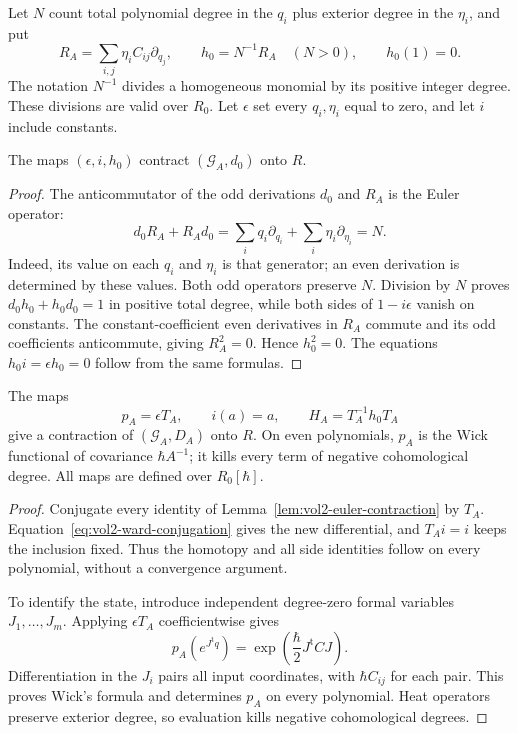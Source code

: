 Let $N$ count total polynomial degree in the $q_i$ plus exterior
degree in the $\eta_i$, and put
\[
 R_A=\sum_{i,j}\eta_iC_{ij}\partial_{q_j},\qquad
 h_0=N^{-1}R_A\quad(N>0),\qquad h_0(1)=0.
\]
The notation $N^{-1}$ divides a homogeneous monomial by its
positive integer degree. These divisions are valid over $R_0$.
Let $\epsilon$ set every $q_i,\eta_i$ equal to zero, and let
$i$ include constants.

\begin{lemma}\label{lem:vol2-euler-contraction}
The maps $(\epsilon,i,h_0)$ contract $(\mathcal G_A,d_0)$ onto $R$.
\end{lemma}
\begin{proof}
The anticommutator of the odd derivations $d_0$ and $R_A$ is the
Euler operator:
\[
 d_0R_A+R_Ad_0
   =\sum_iq_i\partial_{q_i}
      +\sum_i\eta_i\partial_{\eta_i}=N.
\]
Indeed, its value on each $q_i$ and $\eta_i$ is that generator;
an even derivation is determined by these values. Both odd
operators preserve $N$. Division by $N$ proves
$d_0h_0+h_0d_0=1$ in positive total degree, while both sides of
$1-i\epsilon$ vanish on constants. The constant-coefficient even
derivatives in $R_A$ commute and its odd coefficients
anticommute, giving $R_A^2=0$. Hence $h_0^2=0$.
The equations $h_0i=\epsilon h_0=0$ follow from the same formulas.
\end{proof}

\begin{theorem}\label{thm:vol2-gaussian-retract}
The maps
\begin{equation}\label{eq:vol2-gaussian-retract}
 p_A=\epsilon T_A,\qquad i(a)=a,\qquad
 H_A=T_A^{-1}h_0T_A
\end{equation}
give a contraction of $(\mathcal G_A,D_A)$ onto $R$.
On even polynomials, $p_A$ is the Wick functional of covariance
$\hbar A^{-1}$; it kills every term of negative cohomological degree.
All maps are defined over $R_0[\hbar]$.
\end{theorem}
\begin{proof}
Conjugate every identity of Lemma~\ref{lem:vol2-euler-contraction}
by $T_A$. Equation~\eqref{eq:vol2-ward-conjugation} gives the
new differential, and $T_Ai=i$ keeps the inclusion fixed.
Thus the homotopy and all side identities follow on every
polynomial, without a convergence argument.

To identify the state, introduce independent degree-zero formal
variables $J_1,\ldots,J_m$. Applying $\epsilon T_A$
coefficientwise gives
\begin{equation}\label{eq:vol2-wick-generating}
 p_A(e^{J^{\mathrm t}q})
       =\exp\!\left(\frac{\hbar}{2}J^{\mathrm t}CJ\right).
\end{equation}
Differentiation in the $J_i$ pairs all input coordinates, with
$\hbar C_{ij}$ for each pair. This proves Wick's formula and
determines $p_A$ on every polynomial. Heat operators preserve
exterior degree, so evaluation kills negative cohomological degrees.
\end{proof}

